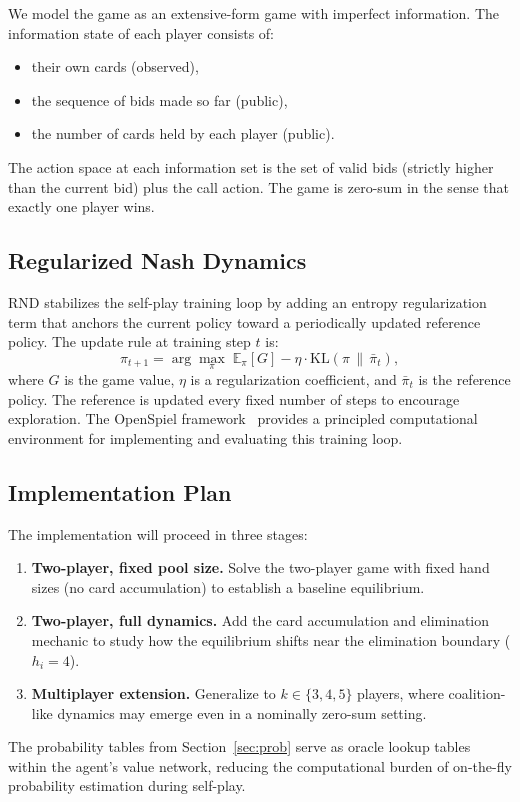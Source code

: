 \documentclass[11pt, a4paper]{article}
\theoremstyle{definition}
\begin{document}
We model the game as an extensive-form game with imperfect information. The information
state of each player consists of:
\begin{itemize}
    \item their own cards (observed),
    \item the sequence of bids made so far (public),
    \item the number of cards held by each player (public).
\end{itemize}
The action space at each information set is the set of valid bids (strictly higher
than the current bid) plus the call action. The game is zero-sum in the sense that
exactly one player wins.

\subsection{Regularized Nash Dynamics}

RND stabilizes the self-play training loop by adding an entropy regularization term
that anchors the current policy toward a periodically updated reference policy. The
update rule at training step $t$ is:
\[
\pi_{t+1} = \arg\max_{\pi} \;\mathbb{E}_{\pi}[G] - \eta \cdot \mathrm{KL}(\pi \,\|\, \bar{\pi}_t),
\]
where $G$ is the game value, $\eta$ is a regularization coefficient, and $\bar{\pi}_t$
is the reference policy. The reference is updated every fixed number of steps to
encourage exploration. The OpenSpiel framework~\cite{openspiel} provides a principled
computational environment for implementing and evaluating this training loop.

\subsection{Implementation Plan}

The implementation will proceed in three stages:
\begin{enumerate}
    \item \textbf{Two-player, fixed pool size.} Solve the two-player game with fixed
          hand sizes (no card accumulation) to establish a baseline equilibrium.
    \item \textbf{Two-player, full dynamics.} Add the card accumulation and
          elimination mechanic to study how the equilibrium shifts near the
          elimination boundary ($h_i = 4$).
    \item \textbf{Multiplayer extension.} Generalize to $k \in \{3, 4, 5\}$ players,
          where coalition-like dynamics may emerge even in a nominally zero-sum setting.
\end{enumerate}
The probability tables from Section~\ref{sec:prob} serve as oracle lookup tables
within the agent's value network, reducing the computational burden of on-the-fly
probability estimation during self-play.
\end{document}
